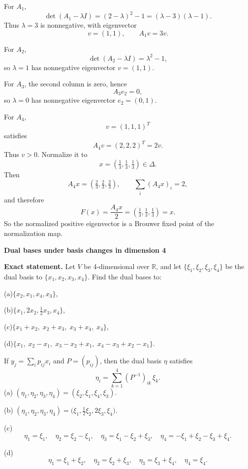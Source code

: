 \begin{solution}
For \(A_1\),
\[
\det(A_1-\lambda I)
=
(2-\lambda)^2-1
=
(\lambda-3)(\lambda-1).
\]
Thus \(\lambda=3\) is nonnegative, with eigenvector
\[
v=(1,1),
\qquad
A_1v=3v.
\]

For \(A_2\),
\[
\det(A_2-\lambda I)=\lambda^2-1,
\]
so \(\lambda=1\) has nonnegative eigenvector \(v=(1,1)\).

For \(A_3\), the second column is zero, hence
\[
A_3e_2=0,
\]
so \(\lambda=0\) has nonnegative eigenvector \(e_2=(0,1)\).

For \(A_4\),
\[
v=(1,1,1)^T
\]
satisfies
\[
A_4v=(2,2,2)^T=2v.
\]
Thus \(v>0\). Normalize it to
\[
x=\left(\tfrac13,\tfrac13,\tfrac13\right)\in\Delta.
\]
Then
\[
A_4x=
\left(\tfrac23,\tfrac23,\tfrac23\right),
\qquad
\sum_i(A_4x)_i=2,
\]
and therefore
\[
F(x)
=
\frac{A_4x}{2}
=
\left(\tfrac13,\tfrac13,\tfrac13\right)
=
x.
\]
So the normalized positive eigenvector is a Brouwer fixed point of the normalization map.
\end{solution}

\begin{problem}[CP-I-0009]
\label{prob:cp-i-0009}
\textbf{Dual bases under basis changes in dimension 4}

\textbf{Exact statement.}
\hspace*{1.5em}Let \(V\) be 4-dimensional over \(\mathbb R\), and let \(\{\xi_1,\xi_2,\xi_3,\xi_4\}\) be the dual basis to \(\{x_1,x_2,x_3,x_4\}\).
Find the dual bases to:

	\par\noindent (a)\quad \(\{x_2,x_1,x_4,x_3\}\),
	\par\noindent (b)\quad \(\{x_1,2x_2,\tfrac12 x_3,x_4\}\),
	\par\noindent (c)\quad \(\{x_1+x_2,\;x_2+x_3,\;x_3+x_4,\;x_4\}\),
	\par\noindent (d)\quad \(\{x_1,\;x_2-x_1,\;x_3-x_2+x_1,\;x_4-x_3+x_2-x_1\}\).

\end{problem}

\begin{solution}
If \(y_j=\sum_i p_{ij}x_i\) and \(P=(p_{ij})\), then the dual basis \(\eta\) satisfies
\[
\eta_i=\sum_{k=1}^4 (P^{-1})_{ik}\,\xi_k.
\]
(a) \((\eta_1,\eta_2,\eta_3,\eta_4)=(\xi_2,\xi_1,\xi_4,\xi_3).\)

(b) \((\eta_1,\eta_2,\eta_3,\eta_4)=\big(\xi_1,\tfrac12\xi_2,2\xi_3,\xi_4\big).\)

(c)
\[
\eta_1=\xi_1,\quad
\eta_2=\xi_2-\xi_1,\quad
\eta_3=\xi_1-\xi_2+\xi_3,\quad
\eta_4=-\xi_1+\xi_2-\xi_3+\xi_4.
\]

(d)
\[
\eta_1=\xi_1+\xi_2,\quad
\eta_2=\xi_2+\xi_3,\quad
\eta_3=\xi_3+\xi_4,\quad
\eta_4=\xi_4.
\]
\end{solution}

